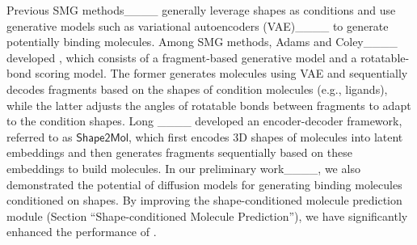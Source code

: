 %
%
%
Previous SMG methods____ generally leverage shapes as conditions and use generative models such as variational autoencoders (VAE)____ to generate potentially binding molecules.  
%
Among SMG methods, Adams and Coley____ developed \squid, which consists of a fragment-based generative model and a rotatable-bond scoring model.
%
The former generates molecules using VAE and sequentially decodes fragments based on the shapes of condition molecules (e.g., ligands), while the latter adjusts the angles of rotatable bonds between fragments to adapt to the condition shapes.
%
%
Long \etal____ developed an encoder-decoder framework, referred to as $\mathsf{Shape2Mol}$, which first encodes 3D shapes of molecules into latent embeddings and then generates fragments sequentially based on these embeddings to build molecules.
%
{In our preliminary work____, we also demonstrated the potential of diffusion models for generating binding molecules conditioned on shapes. 
%
By improving the shape-conditioned molecule prediction module (Section ``Shape-conditioned Molecule Prediction''), we have significantly enhanced the performance of \method.}


